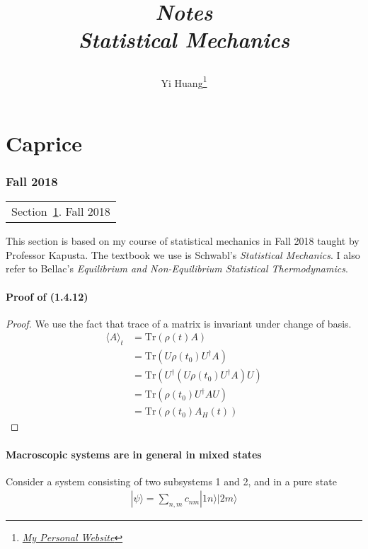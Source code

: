 \documentclass[10pt]{article}
\title{\begin{center}{\Huge \textit{Notes}}\\{{\itshape Statistical Mechanics}}\end{center}}
\author{Yi Huang\footnote{\href{https://yiihuang.com/}{\textit{My Personal Website}}}}
\affiliation{
University of Minnesota
}
\begin{document}
	\maketitle
	\flushbottom
	\newpage
	\pagestyle{fancynotes}
	\part{Caprice}
	\section{Fall 2018}\label{sec:fall2018}
	\begin{margintable}\vspace{.8in}\footnotesize
		\begin{tabularx}{\marginparwidth}{|X}
			Section~\ref{sec:fall2018}. Fall 2018
		\end{tabularx}
	\end{margintable}

	This section is based on my course of statistical mechanics in Fall 2018 taught by Professor Kapusta. The textbook we use is Schwabl's \textit{Statistical Mechanics}. I also refer to Bellac's \textit{Equilibrium and Non-Equilibrium Statistical Thermodynamics}.

	\subsection{Proof of (1.4.12)}
	\begin{proof}
		We use the fact that trace of a matrix is invariant under change of basis.
		\begin{align*}
		\langle A \rangle_t &= \mathrm{Tr}(\rho(t) A) \\
		&= \mathrm{Tr}(U \rho(t_0) U^{\dagger} A) \\
		&= \mathrm{Tr}(U^{\dagger} (U \rho(t_0) U^{\dagger} A) U) \\
		&= \mathrm{Tr}(\rho(t_0) U^{\dagger} A U) \\
		&= \mathrm{Tr}(\rho(t_0) A_H(t))
		\end{align*}
	\end{proof}

	\subsection{Macroscopic systems are in general in mixed states}

	Consider a system consisting of two subsystems 1 and 2, and in a pure state
	\begin{gather}
		|\psi\rangle = \sum_{n,m}c_{nm} |1n\rangle |2m\rangle
	\end{gather}
\end{document}
